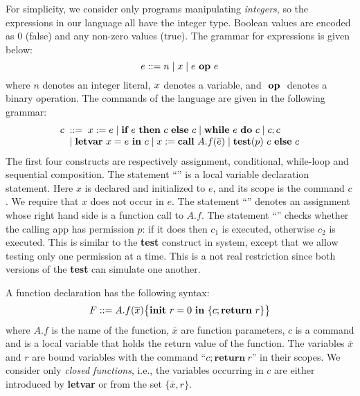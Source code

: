 For simplicity, we consider only programs manipulating \emph{integers}, so the expressions in our language all have the integer type. Boolean values are encoded as 0 (false) and any non-zero values (true). The grammar for expressions is given below:
\begin{equation*}
e ::= n \mid x \mid {e}~\textbf{op}~{e}
\end{equation*}
where $n$ denotes an integer literal, $x$ denotes a variable, and ${}~\textbf{op}~{}$ denotes a binary operation.
The commands of the language are given in the following grammar:
\begin{equation*}
\begin{array}{l}
  c\;::=\; {x}:={e} \mid {\textbf{if}~{e}~\textbf{then}~{c}~\textbf{else}~{c}} \mid  \textbf{while}~{e}~\textbf{do}~{c} \mid {c};{c}  \\
  \quad \mid {\textbf{letvar}~ {x} = {e} ~\textbf{in}~ {c}} \mid {x}:=\textbf{call}~{A.f}({\overline{e}}) \mid {\textbf{test}({p})~{c} ~\textbf{else}~ {c}}
\end{array}
\end{equation*}
The first four constructs are respectively assignment, conditional, while-loop and sequential composition.
The statement ``'' is a local variable declaration statement. Here $x$ is
declared and initialized to $e$, and its scope is the command $c$. We require
that $x$ does not occur in $e.$
The statement ``''  denotes an assignment whose right hand side is
a function call to $A.f$. The statement
``''
checks whether the calling app has permission $p$: if it does then $c_1$ is executed,
otherwise $c_2$ is executed.
This is similar to the \textbf{test} construct in {\BN} system, except that we allow testing only
one permission at a time. This is a not real restriction since both versions of the \textbf{test} can simulate one another.


A function declaration has the following syntax:
\begin{equation*}
F ::= {A.f}(\overline{x})\big\{{{\textbf{init}~ {{r}}=0 ~\textbf{in}~\{{c};\textbf{return}~{{r}}\}}}\big\}
\end{equation*}
where $A.f$ is the name of the function, $\bar x$ are function parameters,
$c$ is a command and {\lpRES} is a local variable
that holds the return value of the function.
The variables $\overline{x}$ and $r$ are bound variables with the command ``$c; \textbf{return}~r$'' in their scopes.
We consider only {\em closed functions}, i.e., the variables occurring in $c$
are either introduced by \textbf{letvar} or from the set $\{\overline{x}, r\}$.



